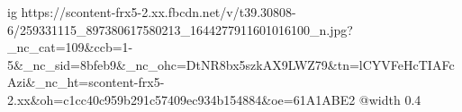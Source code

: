  
 
 
 
 

\ifcmt
  ig https://scontent-frx5-2.xx.fbcdn.net/v/t39.30808-6/259331115_897380617580213_1644277911601016100_n.jpg?_nc_cat=109&ccb=1-5&_nc_sid=8bfeb9&_nc_ohc=DtNR8bx5szkAX9LWZ79&tn=lCYVFeHcTIAFcAzi&_nc_ht=scontent-frx5-2.xx&oh=c1cc40c959b291c57409ec934b154884&oe=61A1ABE2
  @width 0.4
\fi
